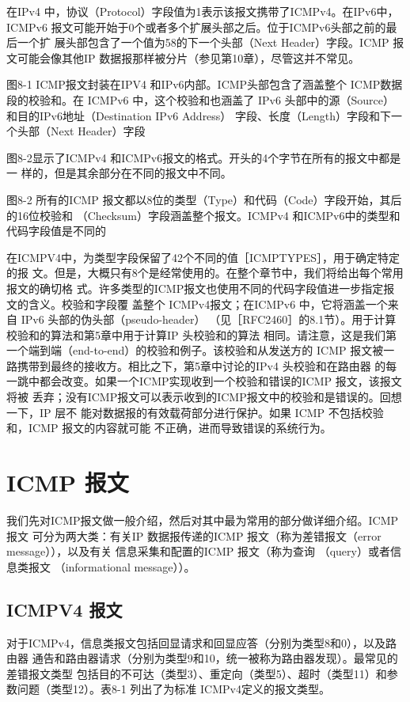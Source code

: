 在IPv4 中，协议（Protocol）字段值为1表示该报文携带了ICMPv4。在IPv6中，
ICMPv6 报文可能开始于0个或者多个扩展头部之后。位于ICMPv6头部之前的最后一个扩
展头部包含了一个值为58的下一个头部（Next Header）字段。ICMP 报文可能会像其他IP
数据报那样被分片（参见第10章），尽管这并不常见。

图8-1 ICMP报文封装在IPV4 和IPv6内部。ICMP头部包含了涵盖整个 ICMP数据段的校验和。在
ICMPv6 中，这个校验和也涵盖了 IPv6 头部中的源（Source）和目的IPv6地址（Destination
IPv6 Address） 字段、长度（Length）字段和下一个头部（Next Header）字段

图8-2显示了ICMPv4 和ICMPv6报文的格式。开头的4个字节在所有的报文中都是一
样的，但是其余部分在不同的报文中不同。

图8-2 所有的ICMP 报文都以8位的类型（Type）和代码（Code）字段开始，其后的16位校验和
（Checksum）字段涵盖整个报文。ICMPv4 和ICMPv6中的类型和代码字段值是不同的

在ICMPV4中，为类型字段保留了42个不同的值［ICMPTYPES］，用于确定特定的报
文。但是，大概只有8个是经常使用的。在整个章节中，我们将给出每个常用报文的确切格
式。许多类型的ICMP报文也使用不同的代码字段值进一步指定报文的含义。校验和字段覆
盖整个 ICMPv4报文；在ICMPv6 中，它将涵盖一个来自 IPv6 头部的伪头部（pseudo-header）
（见［RFC2460］的8.1节）。用于计算校验和的算法和第5章中用于计算IP 头校验和的算法
相同。请注意，这是我们第一个端到端（end-to-end）的校验和例子。该校验和从发送方的
ICMP 报文被一路携带到最终的接收方。相比之下，第5章中讨论的IPv4 头校验和在路由器
的每一跳中都会改变。如果一个ICMP实现收到一个校验和错误的ICMP 报文，该报文将被
丢弃；没有ICMP报文可以表示收到的ICMP报文中的校验和是错误的。回想一下，IP 层不
能对数据报的有效载荷部分进行保护。如果 ICMP 不包括校验和，ICMP 报文的内容就可能
不正确，进而导致错误的系统行为。

\section{ICMP 报文}

我们先对ICMP报文做一般介绍，然后对其中最为常用的部分做详细介绍。ICMP报文
可分为两大类：有关IP 数据报传递的ICMP 报文（称为差错报文（error message）），以及有关
信息采集和配置的ICMP 报文（称为查询 （query）或者信息类报文 （informational message））。
\subsection{ICMPV4 报文}
对于ICMPv4，信息类报文包括回显请求和回显应答（分别为类型8和0），以及路由器
通告和路由器请求（分别为类型9和10，统一被称为路由器发现）。最常见的差错报文类型
包括目的不可达（类型3）、重定向（类型5）、超时（类型11）和参数问题（类型12）。表8-1
列出了为标准 ICMPv4定义的报文类型。

